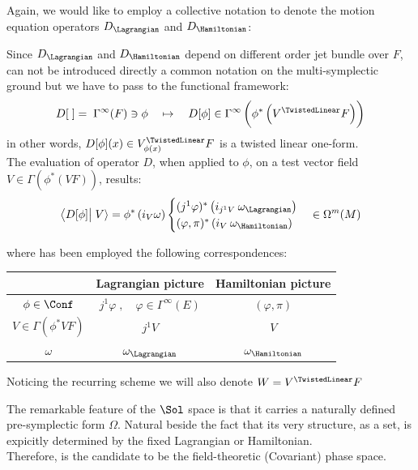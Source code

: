 \documentclass[a4paper,12pt,fleqn]{scrartcl}  %
\begin{document}
Again, we would like to employ a collective notation to denote the motion equation operators $D_\Lagrangian$ and $D_\Hamiltonian$:
\begin{notation}
	Since $D_\Lagrangian$ and $D_\Hamiltonian$ depend on different order jet bundle over $F$, can not be introduced directly a common notation on the multi-symplectic ground but we have to pass to the functional framework:
\begin{displaymath}
	D[\; ] = \; \Gamma^\infty(F) \ni \phi \quad \mapsto \quad D[ \phi ] \in \Gamma^\infty \left( \phi^\ast \left(V^\TwistedLinear F \right)\right)
\end{displaymath}	
in other words, $D[\phi](x) \in V^\TwistedLinear_{\phi(x)}F$ is a twisted linear one-form.
\\
	The evaluation of operator $D$, when applied to $\phi$, on a test vector field $V \in \Gamma(\phi^\ast(VF))$, results:
	\begin{displaymath}
		\left\langle D[\phi] \right\vert \left. V \right\rangle =
		\phi^\ast \left( i_V \omega \right) 
		\begin{cases}
			(j^1 \varphi)^\ast \left( i_{j^1V} \: \omega_\Lagrangian \right) \\
			(\varphi, \pi)^\ast \left( i_V \: \omega_\Hamiltonian \right)
		\end{cases}              
        \in \Omega^m(M)
	\end{displaymath}
	
	where has been employed the following correspondences:
	\begin{center}
		\begin{tabular}{|c|c|c|}
			\hline
			 & Lagrangian picture & Hamiltonian picture \\
			\hline
			$\phi \in \Conf$		&	$j^1 \varphi \; , \quad \varphi \in \Gamma^\infty(E)$		&	$(\varphi, \pi)$	\\
			$V \in \Gamma(\phi^\ast V F )$ & $j^1 V$ & $V$ \\
			$\omega$ & $\omega_\Lagrangian$ & $\omega_\Hamiltonian$ \\
			\hline
		\end{tabular}
	\end{center}	
	
	
	Noticing the recurring scheme we will also denote $	W = V^\TwistedLinear F $
\end{notation}

The remarkable feature of the $\Sol$ space is that it carries a naturally defined pre-symplectic form $\Omega$. Natural beside the fact that its very structure, as a set, is expicitly determined by the fixed Lagrangian or Hamiltonian.\\
Therefore, is the candidate to  be the field-theoretic (Covariant) phase space.
\end{document}
